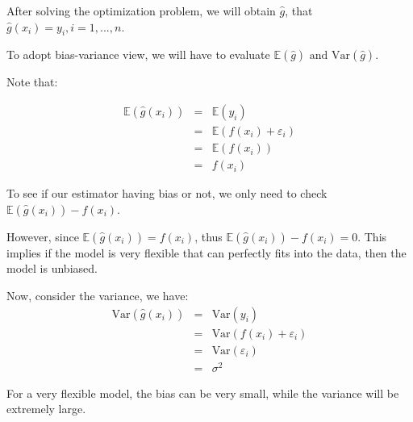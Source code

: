 \documentclass{article}
\theoremstyle{MyNonumberplain}
\theoremstyle{break}
\newcommand{\ev}{\mathbb{E}}
\newcommand{\var}{\text{Var}}
\theoremstyle{break}
\theoremstyle{break}
\theoremstyle{break}
\begin{document}
After solving the optimization problem, we will obtain $\hat{g}$, that $\hat{g}(x_i)=y_i, i=1,...,n$.

To adopt bias-variance view, we will have to evaluate $\ev(\hat{g})\text{ and Var}(\hat{g})$.

Note that:

\begin{eqnarray*}
    \ev(\hat{g}(x_i)) &=& \ev(y_i)\\
                      &=& \ev(f(x_i)+\varepsilon_i)\\
                      &=& \ev(f(x_i))\\
                      &=& f(x_i)
\end{eqnarray*}

To see if our estimator having bias or not, we only need to check $\ev(\hat{g}(x_i))-f(x_i)$.

However, since $\ev(\hat{g}(x_i))=f(x_i)$, thus $\ev(\hat{g}(x_i))-f(x_i)=0$. This implies if the model is very flexible
that can perfectly fits into the data, then the model is unbiased. 

Now, consider the variance, we have: 
\begin{eqnarray*}
    \var(\hat{g}(x_i)) &=& \var(y_i)\\
                       &=& \var(f(x_i)+\varepsilon_i)\\
                       &=& \var(\varepsilon_i)\\
                       &=& \sigma^2
\end{eqnarray*}
 
For a very flexible model, the bias can be very small, while the variance will be extremely large. 
\end{document}
